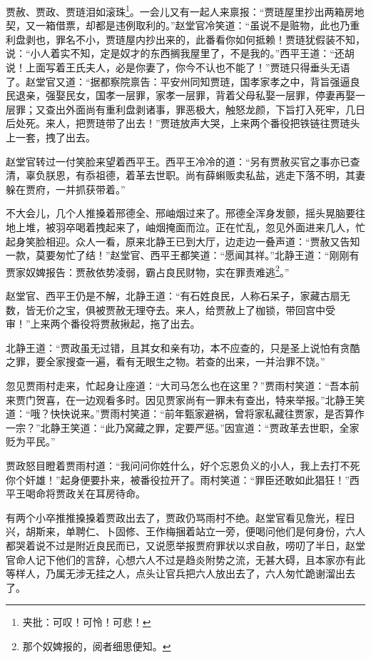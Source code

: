 \documentclass[12pt,oneside]{book}
\begin{document}
贾赦、贾政、贾琏泪如滚珠\footnote{夹批：可叹！可怜！可悲！}。一会儿又有一起人来禀报：“贾琏屋里抄出两箱房地契，又一箱借票，却都是违例取利的。”赵堂官冷笑道：“虽说不是赃物，此也乃重利盘剥也，罪名不小，贾琏屋内抄出来的，此番看你如何抵赖！贾琏犹假装不知，说：“小人着实不知，定是奴才的东西搁我屋里了，不是我的。”西平王道：“还胡说！上面写着王氏夫人，必是你妻了，你今不认也不能了！”贾琏只得垂头无语了。赵堂官又道：“据都察院禀告：平安州同知贾琏，国孝家孝之中，背旨强逼良民退亲，强娶民女，国孝一层罪，家孝一层罪，背着父母私娶一层罪，停妻再娶一层罪；又查出外面尚有重利盘剥诸事，罪恶极大，触怒龙颜，下旨打入死牢，几日后处死。来人，把贾琏带了出去！”贾琏放声大哭，上来两个番役把铁链往贾琏头上一套，拽了出去。

赵堂官转过一付笑脸来望着西平王。西平王冷冷的道：“另有贾赦买官之事亦已查清，辜负朕恩，有忝祖德，着革去世职。尚有薛蝌贩卖私盐，逃走下落不明，其妻躲在贾府，一并抓获带着。”

不大会儿，几个人推搡着邢德全、邢岫烟过来了。邢德全浑身发颤，摇头晃脑要往地上堆，被羽卒喝着拽起来了，岫烟掩面而泣。正在忙乱，忽见外面进来几人，忙起身笑脸相迎。众人一看，原来北静王已到大厅，边走边一叠声道：“贾赦又告知一款，莫要匆忙了结！”赵堂官、西平王都笑道：“愿闻其祥。”北静王道：“刚刚有贾家奴婢报告：贾赦依势凌弱，霸占良民财物，实在罪责难逃\footnote{那个奴婢报的，阅者细思便知。}。”

赵堂官、西平王仍是不解，北静王道：“有石姓良民，人称石呆子，家藏古扇无数，皆无价之宝，俱被贾赦无理夺去。来人，给贾赦上了枷锁，带回宫中受审！”上来两个番役将贾赦揪起，拖了出去。

北静王道：“贾政虽无过错，且其女和亲有功，本不应查的，只是圣上说怕有贪酷之罪，要全家搜查一遍，看有无眼生之物。若查的出来，一并治罪不饶。”

忽见贾雨村走来，忙起身让座道：“大司马怎么也在这里？”贾雨村笑道：“吾本前来贾门贺喜，在一边观看多时。因见贾家尚有一罪未有查出，特来举报。”北静王笑道：“哦？快快说来。”贾雨村笑道：“前年甄家避祸，曾将家私藏往贾家，是否算作一宗？”北静王笑道：“此乃窝藏之罪，定要严惩。”因宣道：“贾政革去世职，全家贬为平民。”

贾政怒目瞪着贾雨村道：“我问问你姓什么，好个忘恩负义的小人，我上去打不死你个奸雄！”起身便要扑来，被番役拉开了。雨村笑道：“罪臣还敢如此猖狂！”西平王喝命将贾政关在耳房待命。

有两个小卒推推搡搡着贾政出去了，贾政仍骂雨村不绝。赵堂官看见詹光，程日兴，胡斯来，单聘仁、卜固修、王作梅捆着站立一旁，便喝问他们是何身份，六人都哭着说不过是附近良民而已，又说愿举报贾府罪状以求自赦，唠叨了半日，赵堂官命人记下他们的言辞，心想六人不过是趋炎附势之流，无甚大碍，且本家亦有此等样人，乃属无涉无挂之人，点头让官兵把六人放出去了，六人匆忙跪谢溜出去了。
\end{document}
